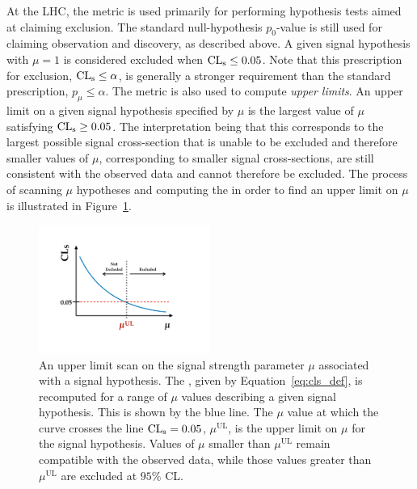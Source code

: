 At the LHC, the \cls metric is used primarily for performing hypothesis tests aimed at claiming exclusion.
The standard null-hypothesis $p_0$-value is still used for claiming observation and discovery, as described above.
A given signal hypothesis with $\mu = 1$ is considered excluded when $\text{CL}_{\text{s}} \le 0.05$.
Note that this prescription for exclusion, $\text{CL}_{\text{s}} \le \alpha$, is generally a stronger requirement than the
standard prescription, $p_{\mu} \le \alpha$.
The \cls metric is also used to compute \textit{upper limits}.
An upper limit on a given signal hypothesis specified by $\mu$
is the largest value of $\mu$ satisfying $\text{CL}_{\text{s}} \ge 0.05$.
The interpretation being that this corresponds to the largest possible signal cross-section
that is unable to be excluded and therefore smaller values of $\mu$, corresponding
to smaller signal cross-sections, are still consistent with the observed data and cannot therefore
be excluded.
The process of scanning $\mu$ hypotheses and computing the \cls in order to find
an upper limit on $\mu$ is illustrated in Figure~\ref{fig:upper_limit_scan_cartoon}.

\begin{figure}[!htb]
    \begin{center}
        \includegraphics[width=0.5\textwidth]{figures/common_ana/stat_hypo/upper_limit_scan_examplePDF}
        \caption{
            An upper limit scan on the signal strength parameter $\mu$ associated with a signal hypothesis.
            The \cls, given by Equation~\ref{eq:cls_def}, is recomputed for a range of $\mu$ values
            describing a given signal hypothesis.
            This is shown by the blue line.
            The $\mu$ value at which the \cls curve crosses the line $\text{CL}_{\text{s}} = 0.05$, $\mu^{\text{UL}}$, is the
            upper limit on $\mu$ for the signal hypothesis.
            Values of $\mu$ smaller than $\mu^{\text{UL}}$ remain compatible with the observed data,
            while those values greater than $\mu^{\text{UL}}$ are excluded at $95\%$ CL.
        }
        \label{fig:upper_limit_scan_cartoon}
    \end{center}
\end{figure}

